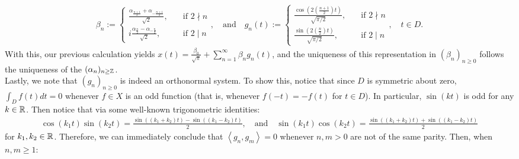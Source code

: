 \documentclass[10pt]{article}
\newcommand{\1}[1]{\mathbbm{1}_{#1}} \newcommand{\mc}[1]{\mathcal{#1}}
\newcommand{\ip}[2]{\left\langle#1,#2\right\rangle }
\begin{document}
    \begin{align*}
        \beta_n:=\begin{cases}
            \frac{\alpha_{\frac{n+1}{2}}+\alpha_{-\frac{n+1}{2}}}{\sqrt{2}},\quad&\text{if $2\nmid n$}\\
            i\frac{\alpha_{\frac{n}{2}}-\alpha_{-\frac{n}{2}}}{\sqrt{2}},\quad&\text{if $2\mid n$}
        \end{cases},\quad\text{and}\quad g_n(t):=\begin{cases}
            \frac{\cos(2(\frac{n+1}{2})t)}{\sqrt{\pi/2}},\quad&\text{if $2\nmid n$}\\
            \frac{\sin(2(\frac{n}{2})t)}{\sqrt{\pi/2}},\quad&\text{if $2\mid n$}
        \end{cases},\quad t\in D.
    \end{align*}
    With this, our previous calculation yields $x(t)=\frac{\beta_0}{\sqrt{\pi}}+\sum_{n=1}^\infty\beta_ng_n(t)$, and the uniqueness of this representation in $(\beta_n)_{n\geq 0}$ follows the uniqueness of the $(\alpha_n)_{n\geq \mathbb{Z}}$.\\[5pt]
    \indent Lastly, we note that $(g_n)_{n\geq 0}$ is indeed an orthonormal system. To show this,
    notice that since $D$ is symmetric about zero, $\int_Df(t)dt=0$ whenever $f\in X$ is an odd function (that is, whenever $f(-t)=-f(t)$ for $t\in D$). In particular, $\sin(kt)$ is odd for any $k\in\mathbb{R}$. Then notice that via some well-known trigonometric identities:
    \begin{align*}
        \cos(k_1t)\sin(k_2t)=\frac{\sin((k_1+k_2)t)-\sin((k_1-k_2)t)}{2},\quad\text{and}\quad \sin(k_1t)\cos(k_2t)=\frac{\sin((k_1+k_2)t)+\sin((k_1-k_2)t)}{2}
    \end{align*}
    for $k_1,k_2\in\mathbb{R}$. Therefore, we can immediately conclude that $\ip{g_n}{g_m}=0$ whenever $n,m>0$ are not of the same parity. Then, when $n,m\geq 1$:
\end{document}
